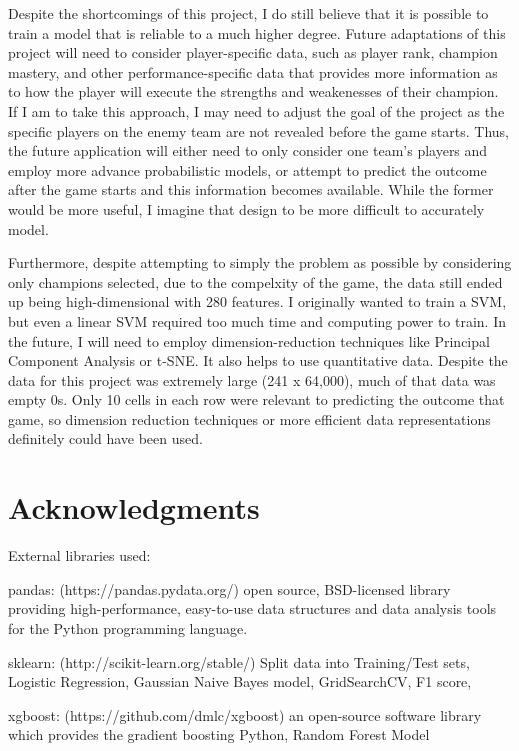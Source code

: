 \documentclass[11pt]{article}
\begin{document}
Despite the shortcomings of this project, I do still believe that it is
possible to train a model that is reliable to a much higher degree.
Future adaptations of this project will need to consider player-specific
data, such as player rank, champion mastery, and other
performance-specific data that provides more information as to how the
player will execute the strengths and weakenesses of their champion. If
I am to take this approach, I may need to adjust the goal of the project
as the specific players on the enemy team are not revealed before the
game starts. Thus, the future application will either need to only
consider one team's players and employ more advance probabilistic
models, or attempt to predict the outcome after the game starts and this
information becomes available. While the former would be more useful, I
imagine that design to be more difficult to accurately model.

Furthermore, despite attempting to simply the problem as possible by
considering only champions selected, due to the compelxity of the game,
the data still ended up being high-dimensional with 280 features. I
originally wanted to train a SVM, but even a linear SVM required too
much time and computing power to train. In the future, I will need to
employ dimension-reduction techniques like Principal Component Analysis
or t-SNE. It also helps to use quantitative data. Despite the data for
this project was extremely large (241 x 64,000), much of that data was
empty 0s. Only 10 cells in each row were relevant to predicting the
outcome that game, so dimension reduction techniques or more efficient
data representations definitely could have been used.

    \section{Acknowledgments}\label{acknowledgments}

    External libraries used:

pandas: (https://pandas.pydata.org/) open source, BSD-licensed library
providing high-performance, easy-to-use data structures and data
analysis tools for the Python programming language.

sklearn: (http://scikit-learn.org/stable/) Split data into Training/Test
sets, Logistic Regression, Gaussian Naive Bayes model, GridSearchCV, F1
score,

xgboost: (https://github.com/dmlc/xgboost) an open-source software
library which provides the gradient boosting Python, Random Forest Model
\end{document}
